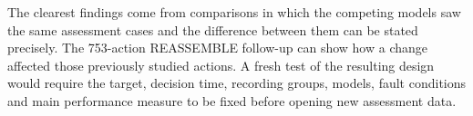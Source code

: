 The clearest findings come from comparisons in which the competing models saw the
same assessment cases and the difference between them can be stated precisely.
The 753-action REASSEMBLE follow-up can show how a change affected those previously
studied actions. A fresh test of the resulting design would require the target,
decision time, recording groups, models, fault conditions and main performance
measure to be fixed before opening new assessment data.


